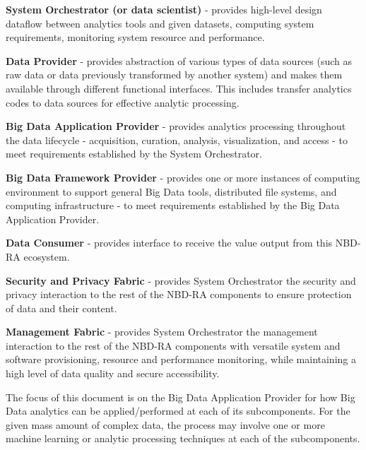 \begin{description}

\item  {\bf System Orchestrator (or data scientist)} - provides high-level 
design dataflow between analytics tools and given datasets, computing system requirements, 
monitoring system resource and performance.


\item {\bf Data Provider} - provides abstraction of various types of 
data sources (such as raw data or data previously transformed by another system) 
and makes them available through different functional interfaces. This includes 
transfer analytics codes to data sources for effective analytic processing.


\item {\bf Big Data Application Provider} - provides analytics processing 
throughout the data lifecycle - acquisition, curation, analysis, visualization, 
and access - to meet requirements established by the System Orchestrator.


\item {\bf Big Data Framework Provider} - provides one or more instances 
of computing environment to support general Big Data tools, distributed file systems, 
and computing infrastructure - to meet requirements established by the Big Data 
Application Provider.


\item  {\bf Data Consumer} - provides interface to receive the value output 
from this NBD-RA ecosystem.


\item  {\bf Security and Privacy Fabric} - provides System Orchestrator 
the security and privacy interaction to the rest of the NBD-RA components to ensure 
protection of data and their content.


\item {\bf Management Fabric} - provides System Orchestrator the management 
interaction to the rest of the NBD-RA components with versatile system and software 
provisioning, resource and performance monitoring, while maintaining a high level 
of data quality and secure accessibility.

\end{description}


The focus of this document is on the Big Data Application Provider for how Big 
Data analytics can be applied/performed at each of its subcomponents. For the given 
mass amount of complex data, the process may involve one or more machine learning 
or analytic processing techniques at each of the subcomponents. 



